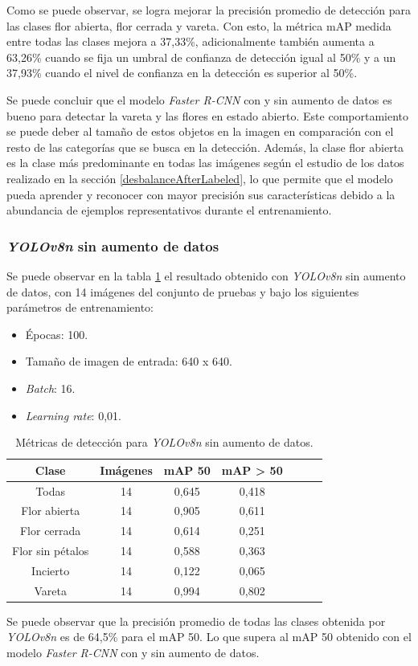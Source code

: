 Como se puede observar, se logra mejorar la precisión promedio de detección para las clases flor abierta, flor cerrada y vareta. Con esto, la métrica mAP medida entre todas las clases mejora a 37,33\%, adicionalmente también aumenta a 63,26\% cuando se fija un umbral de confianza de detección igual al 50\% y a un 37,93\% cuando el nivel de confianza en la detección es superior al 50\%.

Se puede concluir que el modelo \textit{Faster R-CNN} con y sin aumento de datos es bueno para detectar la vareta y las flores en estado abierto. Este comportamiento se puede deber al tamaño de estos objetos en la imagen en comparación con el resto de las categorías que se busca en la detección. Además, la clase flor abierta es la clase más predominante en todas las imágenes según el estudio de los datos realizado en la sección \ref{desbalanceAfterLabeled}, lo que permite que el modelo pueda aprender y reconocer con mayor precisión sus características debido a la abundancia de ejemplos representativos durante el entrenamiento.

\subsubsection{\textit{YOLOv8n} sin aumento de datos}

Se puede observar en la tabla \ref{tab:resultadosYoloSinAug} el resultado obtenido con \textit{YOLOv8n} sin aumento de datos, con 14 imágenes del conjunto de pruebas y bajo los siguientes parámetros de entrenamiento:

\begin{itemize}
	\item Épocas: 100.
    \item Tamaño de imagen de entrada: 640 x 640.
    \item \textit{Batch}: 16.
    \item \textit{Learning rate}: 0,01.
\end{itemize}

\begin{table}[h]
	\centering
	\caption{Métricas de detección para \textit{YOLOv8n} sin aumento de datos.}
	\begin{tabular}{c c c c c c c}    
		\toprule
		\textbf{Clase}&\textbf{Imágenes}&\textbf{mAP 50}&\textbf{mAP > 50}\\
		\midrule
		Todas & 14 & 0,645 & 0,418\\
		Flor abierta & 14 & 0,905 & 0,611 \\
		Flor cerrada & 14 & 0,614 & 0,251 \\
		Flor sin pétalos & 14 & 0,588 & 0,363 \\
		Incierto & 14 & 0,122 & 0,065 \\
		Vareta & 14 & 0,994 & 0,802 \\		
		\bottomrule
		\hline
	\end{tabular}
	\label{tab:resultadosYoloSinAug}
\end{table}
\newpage
Se puede observar que la precisión promedio de todas las clases obtenida por \textit{YOLOv8n} es de 64,5\% para el mAP 50. Lo que supera al mAP 50 obtenido con el modelo \textit{Faster R-CNN} con y sin aumento de datos.

